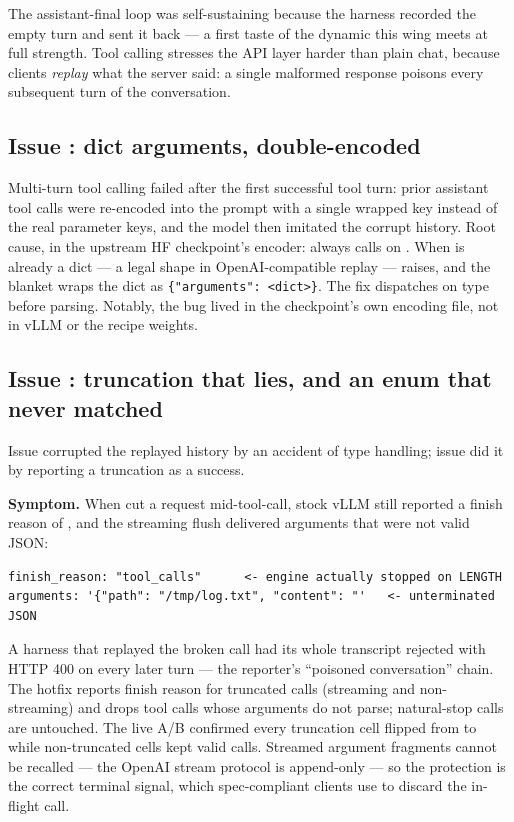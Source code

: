 The assistant-final loop was self-sustaining because the harness recorded
the empty turn and sent it back --- a first taste of the dynamic this wing
meets at full strength. Tool calling stresses the API layer harder than
plain chat, because clients
\emph{replay} what the server said: a single malformed response poisons every
subsequent turn of the conversation.

\subsection{Issue : dict arguments, double-encoded}

Multi-turn tool calling failed after the first successful tool turn: prior
assistant tool calls were re-encoded into the prompt with a single wrapped
 key instead of the real parameter keys, and the model then
imitated the corrupt history. Root cause, in the upstream HF checkpoint's
encoder:  always calls 
on . When  is already a
dict --- a legal shape in OpenAI-compatible replay --- 
raises, and the blanket  wraps the dict as
\texttt{\{"arguments": <dict>\}}. The fix dispatches on type before parsing.
Notably, the bug lived in the checkpoint's own encoding file, not in vLLM or
the recipe weights.

\subsection{Issue : truncation that lies, and an enum that never matched}

Issue  corrupted the replayed history by an accident of type
handling; issue  did it by reporting a truncation as a success.

\textbf{Symptom.} When  cut a request mid-tool-call, stock
vLLM still reported a finish reason of , and the streaming
flush delivered arguments that were not valid JSON:

\begin{lstlisting}
finish_reason: "tool_calls"      <- engine actually stopped on LENGTH
arguments: '{"path": "/tmp/log.txt", "content": "'   <- unterminated JSON
\end{lstlisting}

A harness that replayed the broken call had its whole transcript rejected with
HTTP 400 on every later turn --- the reporter's ``poisoned conversation''
chain. The hotfix reports finish reason  for truncated calls
(streaming and non-streaming) and drops tool calls whose arguments do not
parse; natural-stop calls are untouched. The live A/B confirmed every
truncation cell flipped from  to  while
non-truncated cells kept valid calls. Streamed argument fragments cannot be
recalled --- the OpenAI stream protocol is append-only --- so the protection is
the correct terminal signal, which spec-compliant clients use to discard the
in-flight call.

